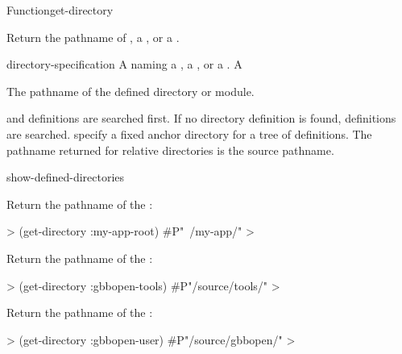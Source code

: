 \documentclass[10pt,twoside,english,pdftex]{article}
\begin{document}
\begin{functiondoc}{Function}{get-directory}{
    \returns{} }
%

\fnsyntax 

\fnpurpose Return the pathname of , a
, or a .

\fnpackage {}

\fnmodule {}

\fnargs
\begin{args}{directory-specification}
\arg[name] A  naming a , a
, or a .
\arg[pathname] A 
\end{args}

\fnreturns The pathname of the defined directory or module.

\fnerrors
\relativedircircularity

\fndescription {} and  definitions are
searched first.  If no  directory definition is found,
 definitions are searched.   specify a
fixed anchor directory for a tree of  definitions.
The pathname returned for relative directories is the source pathname.

\begin{alsos}{show-defined-directories}
\end{alsos}

\fnexamples

Return the pathname of the  :
%
\W\supp
\begin{example}
  > (get-directory :my-app-root)
  #P"~/my-app/"
  >
\end{example}
%
Return the pathname of the  :
%
\W\supp\notpretop
\begin{example}
  > (get-directory :gbbopen-tools)
  #P"/source/tools/"
  >
\end{example}
%
Return the pathname of the  :
%
\W\supp\notpretop
\begin{example}
  > (get-directory :gbbopen-user)
  #P"/source/gbbopen/"
  >
\end{example}

\end{functiondoc}
\end{document}
